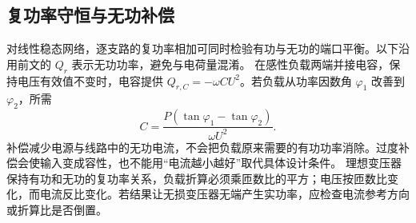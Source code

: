\subsection{复功率守恒与无功补偿}
对线性稳态网络，逐支路的复功率相加可同时检验有功与无功的端口平衡。以下沿用前文的 $Q_r$ 表示无功功率，避免与电荷量混淆。
在感性负载两端并接电容，保持电压有效值不变时，电容提供 $Q_{r,C}=-\omega CU^2$。若负载从功率因数角 $\varphi_1$ 改善到 $\varphi_2$，所需
\[
 C=\frac{P(\tan\varphi_1-\tan\varphi_2)}{\omega U^2}.
\]
补偿减少电源与线路中的无功电流，不会把负载原来需要的有功功率消除。过度补偿会使输入变成容性，也不能用“电流越小越好”取代具体设计条件。
理想变压器保持有功和无功的复功率关系，负载折算必须乘匝数比的平方；电压按匝数比变化，而电流反比变化。若结果让无损变压器无端产生实功率，应检查电流参考方向或折算比是否倒置。

